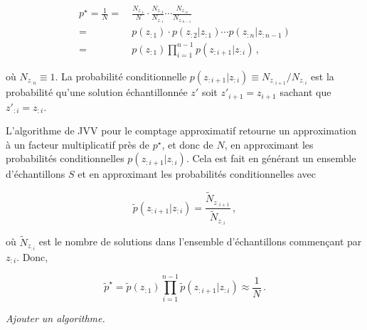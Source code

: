 \begin{align}
    p^\star = \frac1N =&{\ } \frac{N_{z_{:1}}}{N} \cdot \frac{N_{z_{:2}}}{N_{z_{:1}}} \cdots \frac{N_{z_{:n}}}{N_{z_{:n-1}}} \\
    =&{\ } p(z_{:1}) \cdot p(z_{:2}|z_{:1}) \cdots p(z_{:n}|z_{:n-1}) \\
    =&{\ } p(z_{:1}) \prod_{i=1}^{n-1} p(z_{:i+1}|z_{:i}) \,,
\end{align}

où $N_{z_{:n}} \equiv 1$. La probabilité conditionnelle $p(z_{:i+1}|z_{:i}) \equiv N_{z_{:i+1}} / N_{z_{:i}}$ est la probabilité qu'une solution échantillonnée $z'$ soit $z'_{i+1} = z_{i+1}$ sachant que $z'_{:i} = z_{:i}$.  

L'algorithme de JVV pour le comptage approximatif retourne un approximation à un facteur multiplicatif près de $p^{\star}$, et donc de $N$, en approximant les probabilités conditionnelles $p(z_{:i+1}|z_{:i})$. Cela est fait en générant un ensemble d'échantillons $S$ et en approximant les probabilités conditionnelles avec

\begin{equation}
    \tilde p(z_{:i+1}|z_{:i}) = \frac{ \tilde N_{z_{:i+1}} }{ \tilde N_{z_{:i}} } \,,
\end{equation}

où $\tilde{N}_{z_{:i}}$ est le nombre de solutions dans l'ensemble d'échantillons commençant par $z_{:i}$. Donc,

\begin{equation}
    \tilde p^\star = \tilde p(z_{:1}) \prod_{i=1}^{n-1} \tilde p(z_{:i+1}|z_{:i}) \approx \frac1N \,.
\end{equation}



\textcolor{mydarkred}{\textit{Ajouter un algorithme.}}